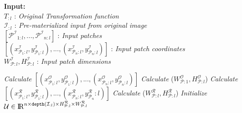 \begin{algorithm}
    \caption{}
    \label{alg:incinference}
    \begin{flushleft}
     \hspace*{1mm} \textbf{Input:} \\
     \hspace*{3mm} $T_{:l}$ : \textit{Original Transformation function}\\
     \hspace*{3mm} $\mathcal{I}_{:l}$ : \textit{Pre-materialized input from original image}\\
     \hspace*{3mm} $[\mathcal{P^I}_{1:l},...,\mathcal{P^I}_{n:l}]$ : \textit{Input patches}\\
     \hspace*{3mm} $[(x^\mathcal{I}_{\mathcal{P}_1:l},y^\mathcal{I}_{\mathcal{P}_1:l}),...,(x^\mathcal{I}_{\mathcal{P}_n:l},y^\mathcal{I}_{\mathcal{P}_n:l})]$ : \textit{Input patch coordinates}\\
     \hspace*{3mm} $W^\mathcal{I}_{\mathcal{P}:l},H^\mathcal{I}_{\mathcal{P}:l}$ : \textit{Input patch dimensions}
    \end{flushleft}


    \begin{algorithmic}[1]
    \State \textit{Calculate} $[(x^\mathcal{O}_{\mathcal{P}_1:l},y^\mathcal{O}_{\mathcal{P}_1:l}),...,(x^\mathcal{O}_{\mathcal{P}_n:l},y^\mathcal{O}_{\mathcal{P}_n:l})]$ 
    \State \textit{Calculate} ($W^\mathcal{O}_{\mathcal{P}:1},H^\mathcal{O}_{\mathcal{P}:l}$)
    \State \textit{Calculate} $[(x^\mathcal{R}_{\mathcal{P}_1:l},y^\mathcal{R}_{\mathcal{P}_1:l}),...,(x^\mathcal{R}_{\mathcal{P}_n:l},y^\mathcal{R}_{\mathcal{P}_n}:l)]$
    \State \textit{Calculate} ($W^\mathcal{R}_{\mathcal{P}:l},H^\mathcal{R}_{\mathcal{P}:l}$)
    \State \textit{Initialize} $\mathcal{U} \in \mathcal{\rm I\!R}^{n \times \texttt{depth}(\mathcal{I}_{:l}) \times H^\mathcal{R}_{\mathcal{P}:l} \times W^\mathcal{R}_{\mathcal{P}:l}}$


\end{algorithmic}
\end{algorithm}
